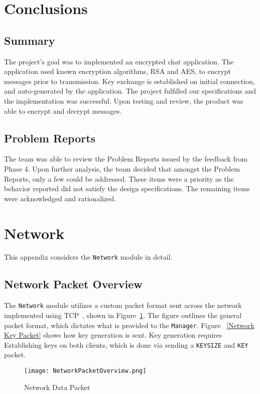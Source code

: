 \documentclass[sigconf]{acmart}
\begin{document}
\section{Conclusions}
\subsection{Summary}
The project’s goal was to implemented an encrypted chat application. The
application used known encryption algorithms, RSA and AES, to encrypt messages
prior to transmission. Key exchange is established on initial connection, and
auto-generated by the application.  The project fulfilled our specifications
and the implementation was successful. Upon testing and review, the product
was able to encrypt and decrypt messages.
\subsection{Problem Reports}
The team was able to review the Problem Reports issued by the feedback from
Phase 4. Upon further analysis, the team decided that amongst the Problem
Reports, only a few could be addressed. These items were a priority as the
behavior reported did not satisfy the design specifications. The remaining
items were acknowledged and rationalized.

\appendix
\section{Network} %
This appendix considers the \texttt{Network} module in detail.

\subsection{Network Packet Overview}
The \texttt{Network} module utilizes a custom packet format sent across the
network implemented using TCP~\cite{Postel:rfc793}, shown in
Figure~\ref{Network Packet Overview}. The figure outlines the general packet
format, which dictates what is provided to the \texttt{Manager}. Figure
~\ref{Network Key Packet} shows how key generation is sent. Key generation
requires Establishing keys on both clients, which is done via sending a
\texttt{KEYSIZE} and \texttt{KEY} packet.
\begin{figure} [htb]
	\centering
	\texttt{[image: NetworkPacketOverview.png]}
	\caption{Network Data Packet}
	\label{Network Packet Overview}
\end{figure}
\end{document}
